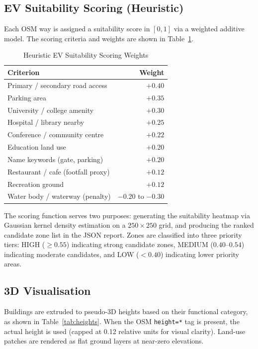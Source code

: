 \documentclass[conference]{IEEEtran}
\begin{document}
\subsection{EV Suitability Scoring (Heuristic)}

Each OSM way is assigned a suitability score in $[0, 1]$ via a weighted additive model. The scoring criteria and weights are shown in Table~\ref{tab:ev_score}.

\begin{table}[htbp]
\caption{Heuristic EV Suitability Scoring Weights}
\begin{center}
\begin{tabular}{|l|r|}
\hline
\textbf{Criterion} & \textbf{Weight} \\
\hline
Primary / secondary road access & $+0.40$ \\
\hline
Parking area & $+0.35$ \\
\hline
University / college amenity & $+0.30$ \\
\hline
Hospital / library nearby & $+0.25$ \\
\hline
Conference / community centre & $+0.22$ \\
\hline
Education land use & $+0.20$ \\
\hline
Name keywords (gate, parking) & $+0.20$ \\
\hline
Restaurant / cafe (footfall proxy) & $+0.12$ \\
\hline
Recreation ground & $+0.12$ \\
\hline
Water body / waterway (penalty) & $-0.20$ to $-0.30$ \\
\hline
\end{tabular}
\label{tab:ev_score}
\end{center}
\end{table}

The scoring function serves two purposes: generating the suitability heatmap via Gaussian kernel density estimation on a $250 \times 250$ grid, and producing the ranked candidate zone list in the JSON report. Zones are classified into three priority tiers: HIGH ($\geq 0.55$) indicating strong candidate zones, MEDIUM ($0.40$--$0.54$) indicating moderate candidates, and LOW ($< 0.40$) indicating lower priority areas.

\subsection{3D Visualisation}

Buildings are extruded to pseudo-3D heights based on their functional category, as shown in Table~\ref{tab:heights}. When the OSM \texttt{height=*} tag is present, the actual height is used (capped at 0.12 relative units for visual clarity). Land-use patches are rendered as flat ground layers at near-zero elevations.
\end{document}
